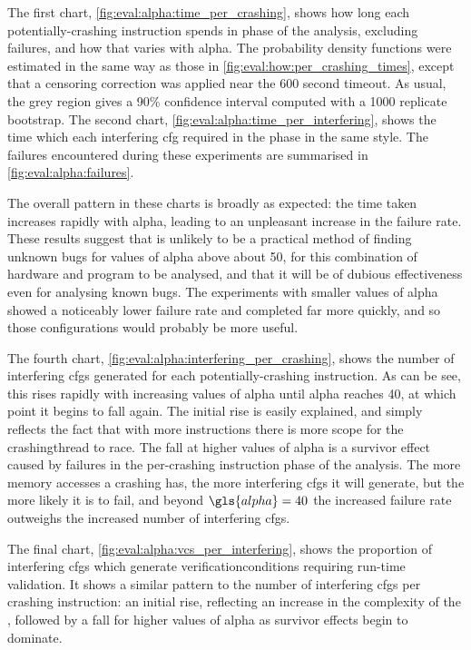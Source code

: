 The first chart, \autoref{fig:eval:alpha:time_per_crashing}, shows how
long each potentially-crashing instruction spends in phase \subcrash{}
of the analysis, excluding failures, and how that varies with
\gls{alpha}.  The probability density functions were estimated in the
same way as those in \autoref{fig:eval:how:per_crashing_times}, except
that a censoring correction was applied near the 600 second timeout.
As usual, the grey region gives a 90\% confidence interval computed
with a 1000 replicate bootstrap.  The second chart,
\autoref{fig:eval:alpha:time_per_interfering}, shows the time which
each interfering \gls{cfg} required in the \subinterfering{} phase in
the same style.  The failures encountered during these experiments are
summarised in \autoref{fig:eval:alpha:failures}.

The overall pattern in these charts is broadly as expected: the time
taken increases rapidly with \gls{alpha}, leading to an unpleasant
increase in the failure rate.  These results suggest that {\technique}
is unlikely to be a practical method of finding unknown bugs for
values of \gls{alpha} above about 50, for this combination of hardware
and program to be analysed, and that it will be of dubious
effectiveness even for analysing known bugs.  The experiments with
smaller values of \gls{alpha} showed a noticeably lower failure rate
and completed far more quickly, and so those configurations would
probably be more useful.

The fourth chart, \autoref{fig:eval:alpha:interfering_per_crashing},
shows the number of interfering \glspl{cfg} generated for each
potentially-crashing instruction.  As can be see, this rises rapidly
with increasing values of \gls{alpha} until \gls{alpha} reaches 40, at
which point it begins to fall again.  The initial rise is easily
explained, and simply reflects the fact that with more instructions
there is more scope for the \gls{crashingthread} to race.  The fall at
higher values of \gls{alpha} is a survivor effect caused by failures
in the per-crashing instruction phase of the analysis.  The more
memory accesses a crashing {\StateMachine} has, the more interfering
\glspl{cfg} it will generate, but the more likely it is to fail, and
beyond $\gls{alpha}=40$ the increased failure rate outweighs the
increased number of interfering \glspl{cfg}.

The final chart, \autoref{fig:eval:alpha:vcs_per_interfering}, shows
the proportion of interfering \glspl{cfg} which generate
\glspl{verificationcondition} requiring run-time validation.  It shows
a similar pattern to the number of interfering \glspl{cfg} per
crashing instruction: an initial rise, reflecting an increase in the
complexity of the {\StateMachines}, followed by a fall for higher
values of \gls{alpha} as survivor effects begin to dominate.

